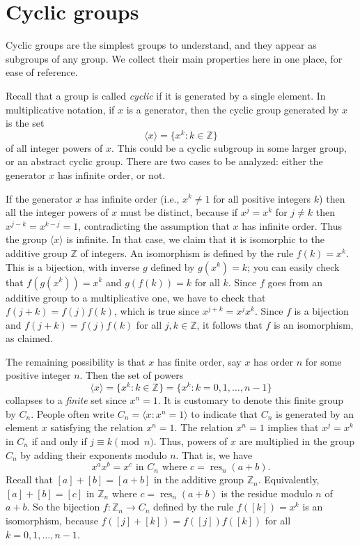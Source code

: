 \documentclass[11pt]{article}
\theoremstyle{definition}
\newcommand{\Z}{\mathbb{Z}} %
\newcommand{\gen}[1]{\langle #1 \rangle}
\newcommand{\res}{\operatorname{res}}
\begin{document}


\setcounter{section}{18}
\section{Cyclic groups}\noindent
Cyclic groups are the simplest groups to understand, and they appear
as subgroups of any group. We collect their main properties here in one
place, for ease of reference.

Recall that a group is called \emph{cyclic} if it
is generated by a single element. In multiplicative notation, if $x$
is a generator, then the cyclic group generated by $x$ is the set
\[
  \gen{x} = \{ x^k : k \in \Z \}
\]
of all integer powers of $x$. This could be a cyclic subgroup in some
larger group, or an abstract cyclic group. There are two cases to be
analyzed: either the generator $x$ has infinite order, or not.

If the generator $x$ has infinite order (i.e., $x^k \ne 1$ for all
positive integers $k$) then all the integer powers of $x$ must be
distinct, because if $x^j = x^k$ for $j \ne k$ then
$x^{j-k} = x^{k-j} = 1$, contradicting the assumption that $x$ has
infinite order.  Thus the group $\gen{x}$ is infinite. In that case,
we claim that it is isomorphic to the additive group $\Z$ of
integers. An isomorphism is defined by the rule $f(k) = x^k$. This is
a bijection, with inverse $g$ defined by $g(x^k) = k$; you can easily
check that $f(g(x^k)) = x^k$ and $g(f(k))=k$ for all $k$.  Since $f$
goes from an additive group to a multiplicative one, we have to check
that $f(j+k) = f(j)f(k)$, which is true since $x^{j+k} = x^j x^k$.
Since $f$ is a bijection and $f(j+k) = f(j)f(k)$ for all $j,k \in \Z$,
it follows that $f$ is an isomorphism, as claimed.

The remaining possibility is that $x$ has finite order, say $x$ has
order $n$ for some positive integer $n$. Then the set of powers
\[
  \gen{x} = \{ x^k : k \in \Z \} = \{ x^k : k = 0, 1, \dots, n-1 \}
\]
collapses to a \emph{finite} set since $x^n = 1$. It is customary to
denote this finite group by $C_n$. People often write
$C_n = \gen{x: x^n = 1}$ to indicate that $C_n$ is generated by an
element $x$ satisfying the relation $x^n = 1$. The relation $x^n = 1$
implies that $x^j = x^k$ in $C_n$ if and only if
$j \equiv k \pmod{n}$.  Thus, powers of $x$ are multiplied in the
group $C_n$ by adding their exponents modulo $n$. That is, we have
\[
   x^a x^b = x^c \text{ in } C_n \text{ where } c = \res_n(a+b).
\]
Recall that $[a] + [b] = [a+b]$ in the additive group
$\Z_n$. Equivalently, $[a] + [b] = [c]$ in $\Z_n$ where
$c = \res_n(a+b)$ is the residue modulo $n$ of $a+b$. So the bijection
$f: \Z_n \to C_n$ defined by the rule $f([k]) = x^k$ is an
isomorphism, because $f([j]+[k]) = f([j]) f([k])$ for all
$k = 0, 1, \dots, n-1$.
\end{document}
